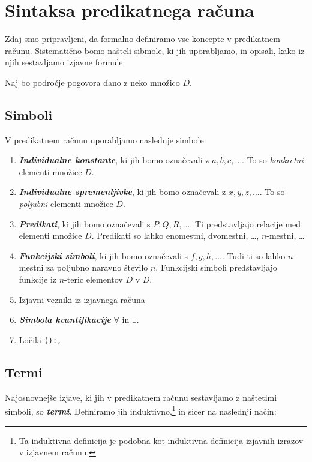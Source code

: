 \documentclass[11pt]{book}
\def\definicija{\color{rdeca}\bf\em}
\theoremstyle{definition}
\theoremstyle{zgled}
\theoremstyle{odprtproblem}
\theoremstyle{domacanaloga}
\theoremstyle{izrek}
\begin{document}
\section{Sintaksa predikatnega računa}

Zdaj smo pripravljeni, da formalno definiramo vse koncepte v predikatnem računu. Sistematično bomo našteli sibmole, ki jih uporabljamo, in opisali, kako iz njih sestavljamo izjavne formule.

Naj bo področje pogovora dano z neko množico $D$.

\subsection{Simboli}

V predikatnem računu uporabljamo naslednje simbole:

\begin{enumerate}
    \item {\definicija Individualne konstante}, ki jih bomo označevali z $a,b,c,\dots$. To so \emph{konkretni} elementi množice $D$.
    \item {\definicija Individualne spremenljivke}, ki jih bomo označevali z $x,y,z,\dots$. To so \emph{poljubni} elementi množice $D$.
    \item {\definicija Predikati}, ki jih bomo označevali s $P,Q,R,\dots$. Ti predstavljajo relacije med elementi množice $D$. Predikati so lahko enomestni, dvomestni, \dots, $n$-mestni, \dots
    \item {\definicija Funkcijski simboli}, ki jih bomo označevali s $f,g,h,\dots$. Tudi ti so lahko $n$-mestni za poljubno naravno število $n$. Funkcijski simboli predstavljajo funkcije iz $n$-teric elementov $D$ v $D$.
    \item Izjavni vezniki iz izjavnega računa
    \item {\definicija Simbola kvantifikacije} $\forall$ in $\exists$.
    \item Ločila \texttt{():,}
\end{enumerate}

\subsection{Termi}

Najosnovnejše izjave, ki jih v predikatnem računu sestavljamo z naštetimi simboli, so {\definicija termi}. Definiramo jih induktivno,\footnote{Ta induktivna definicija je podobna kot induktivna definicija izjavnih izrazov v izjavnem računu.} in sicer na naslednji način:
\end{document}
